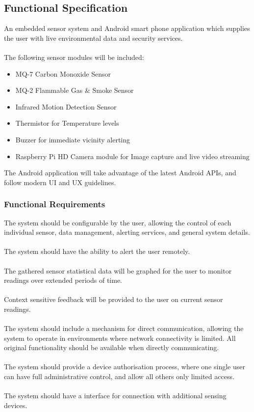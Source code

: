 \documentclass{article}
\begin{document}
\newpage
\subsection{Functional Specification}
An embedded sensor system and Android smart phone application which supplies the user with live environmental data and security services. \\\\
The following sensor modules will be included:

\begin{itemize}
  \item MQ-7 Carbon Monoxide Sensor
  \item MQ-2 Flammable Gas \& Smoke Sensor
  \item Infrared Motion Detection Sensor	
  \item Thermistor for Temperature levels
  \item Buzzer for immediate vicinity alerting
  \item Raspberry Pi HD Camera module for Image capture and live video streaming 
\end{itemize}

\noindent
The Android application will take advantage of the latest Android APIs, and follow modern UI and UX guidelines. 

\subsubsection{Functional Requirements}
The system should be configurable by the user, allowing the control of each individual sensor, data management, alerting services, and general system details. \\\\ The system should have the ability to alert the user remotely.  \\\\ The gathered sensor statistical data will be graphed for the user to monitor readings over extended periods of time. \\\\ Context sensitive feedback will be provided to the user on current sensor readings. \\\\ The system should include a mechanism for direct communication, allowing the system to operate in environments where network connectivity is limited. All original functionality should be available when directly communicating. \\\\ The system should provide a device authorisation process, where one single user can have full administrative control, and allow all others only limited access.  \\\\
The system should have a interface for connection with additional sensing devices. 
\end{document}
